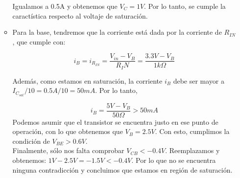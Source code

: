 \documentclass[11pt,fancy,lang=es]{elegantbook}
\begin{document}
\begin{example}
\begin{enumerate}
\begin{itemize}
                        Igualamos a 0.5A y obtenemos que $V_C=1V$. Por lo tanto, se cumple la caractística respecto al voltaje de saturación.

                  \item Para la base, tendremos que la corriente está dada por la corriente de $R_{IN}$, que cumple con:

                        \begin{equation*}
                            i_B=i_{R_{IN}}=\frac{V_{in}-V_B}{R_IN}=\frac{3.3V-V_B}{1k\Omega}
                        \end{equation*}

                        Además, como estamos en saturación, la corriente $i_B$ debe ser mayor a $I_{C_{sat}}/10=0.5A/10=50mA$. Por lo tanto,

                        \begin{equation*}
                            i_B=\frac{5V-V_B}{50\Omega}>50mA
                        \end{equation*}
                        Podemos asumir que el transistor se encuentra justo en ese punto de operación, con lo que obtenemos que $V_B=2.5V$. Con esto, cumplimos la condición de $V_{BE}>0.6V$.\\
                        Finalmente, sólo nos falta comprobar $V_{CB}<-0.4V$. Reemplazamos y obtenemos: $1V-2.5V=-1.5V<-0.4V$. Por lo que no se encuentra ninguna contradicción y concluimos que estamos en región de saturación.


              \end{itemize}
    \end{enumerate}


\end{example}
\end{document}

